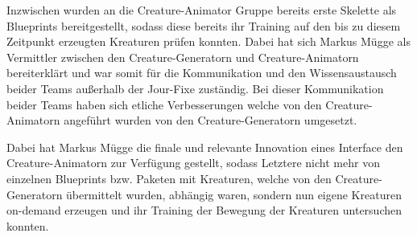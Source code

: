 Inzwischen wurden an die Creature-Animator Gruppe bereits erste Skelette als Blueprints bereitgestellt, sodass diese bereits ihr Training auf den bis zu diesem Zeitpunkt erzeugten Kreaturen prüfen konnten. Dabei hat sich Markus Mügge als Vermittler zwischen den Creature-Generatorn und Creature-Animatorn bereiterklärt und war somit für die Kommunikation und den Wissensaustausch beider Teams außerhalb der Jour-Fixe zuständig. Bei dieser Kommunikation beider Teams haben sich etliche Verbesserungen welche von den Creature-Animatorn angeführt wurden von den Creature-Generatorn umgesetzt. 

Dabei hat Markus Mügge die finale und relevante Innovation eines Interface den Creature-Animatorn zur Verfügung gestellt, sodass Letztere nicht mehr von einzelnen Blueprints bzw. Paketen mit Kreaturen, welche von den Creature-Generatorn übermittelt wurden, abhängig waren, sondern nun eigene Kreaturen on-demand erzeugen und ihr Training der Bewegung der Kreaturen untersuchen konnten.



